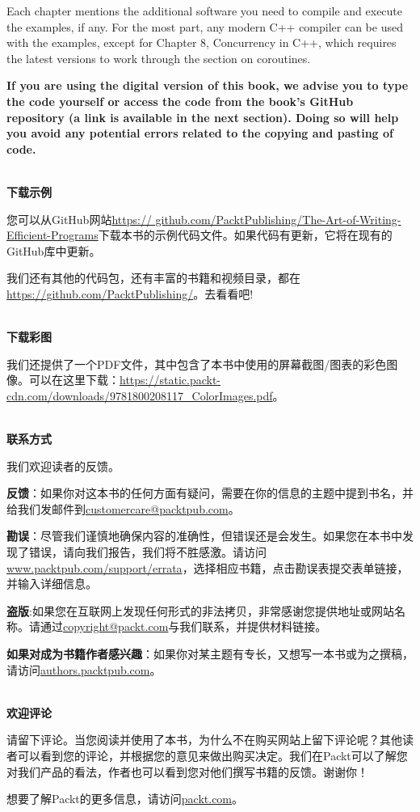 Each chapter mentions the additional software you need to compile and execute the examples, if any. For the most part, any modern C++ compiler can be used with the examples, except for Chapter 8, Concurrency in C++, which requires the latest versions to work through the section on coroutines.

\textbf{If you are using the digital version of this book, we advise you to type the code yourself or access the code from the book's GitHub repository (a link is available in the next 	section). Doing so will help you avoid any potential errors related to the copying and 	pasting of code.}

\hspace*{\fill} \\ %
\textbf{下载示例}

您可以从GitHub网站\url{https://	github.com/PacktPublishing/The-Art-of-Writing-Efficient-Programs}下载本书的示例代码文件。如果代码有更新，它将在现有的GitHub库中更新。

我们还有其他的代码包，还有丰富的书籍和视频目录，都在\url{https://github.com/PacktPublishing/}。去看看吧!

\hspace*{\fill} \\ %
\textbf{下载彩图}

我们还提供了一个PDF文件，其中包含了本书中使用的屏幕截图/图表的彩色图像。可以在这里下载：\url{https://static.packt-cdn.com/downloads/9781800208117\_ColorImages.pdf}。

\hspace*{\fill} \\ %
\textbf{联系方式}

我们欢迎读者的反馈。

\textbf{反馈}：如果你对这本书的任何方面有疑问，需要在你的信息的主题中提到书名，并给我们发邮件到\url{customercare@packtpub.com}。

\textbf{勘误}：尽管我们谨慎地确保内容的准确性，但错误还是会发生。如果您在本书中发现了错误，请向我们报告，我们将不胜感激。请访问\url{www.packtpub.com/support/errata}，选择相应书籍，点击勘误表提交表单链接，并输入详细信息。

\textbf{盗版}:如果您在互联网上发现任何形式的非法拷贝，非常感谢您提供地址或网站名称。请通过\url{copyright@packt.com}与我们联系，并提供材料链接。

\textbf{如果对成为书籍作者感兴趣}：如果你对某主题有专长，又想写一本书或为之撰稿，请访问\url{authors.packtpub.com}。

\hspace*{\fill} \\ %
\textbf{欢迎评论}

请留下评论。当您阅读并使用了本书，为什么不在购买网站上留下评论呢？其他读者可以看到您的评论，并根据您的意见来做出购买决定。我们在Packt可以了解您对我们产品的看法，作者也可以看到您对他们撰写书籍的反馈。谢谢你！

想要了解Packt的更多信息，请访问\url{packt.com}。










